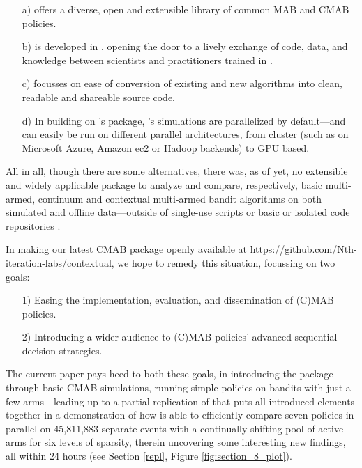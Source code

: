 \documentclass{jss}
\begin{document}
\begin{enumerate}
          \item[a)] offers a diverse, open and extensible library of common MAB and CMAB policies.
          \item[b)] is developed in , opening the door to a lively exchange of code, data, and knowledge between scientists and practitioners trained in .
          \item[c)] focusses on ease of conversion of existing and new algorithms into clean, readable and shareable source code.
          \item[d)]In building on 's  package, 's simulations are parallelized by default---and can easily be run on different parallel architectures, from cluster (such as on Microsoft Azure, Amazon ec2 or Hadoop backends) to GPU based.
\end{enumerate}

All in all, though there are some alternatives, there was, as of yet, no extensible and widely applicable  package to analyze and compare, respectively, basic multi-armed, continuum \citep{Agrawal1995} and contextual multi-armed bandit algorithms on both simulated and offline data---outside of single-use scripts or basic or isolated code repositories \citep{Gandrud2016}.

In making our latest CMAB  package  openly available at https://github.com/Nth-iteration-labs/contextual, we hope to remedy this situation, focussing on two goals:

\begin{enumerate}
          \item[1)]Easing the implementation, evaluation, and dissemination of (C)MAB policies.
          \item[2)]Introducing a wider audience to (C)MAB  policies' advanced sequential decision strategies.
\end{enumerate}

The current paper pays heed to both these goals, in introducing the  package through basic CMAB simulations, running simple policies on bandits with just a few arms---leading up to a partial replication of \cite{Li2010} that puts all introduced elements together in a demonstration of how  is able to efficiently compare seven policies in parallel on 45,811,883 separate events with a continually shifting pool of active arms for six levels of sparsity, therein uncovering some interesting new findings, all within 24 hours (see Section \ref{repl}, Figure \ref{fig:section_8_plot}).
\end{document}
